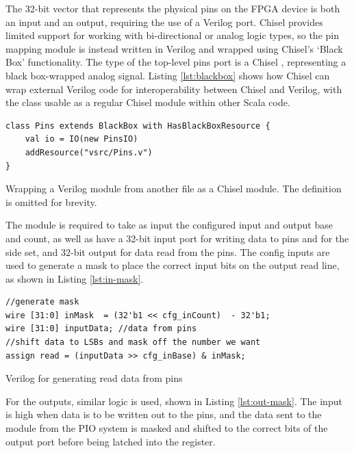 The 32-bit vector that represents the physical pins on the FPGA device is both an input and an output, requiring the use of a Verilog  port. Chisel provides limited support for working with bi-directional or analog logic types, so the pin mapping module is instead written in Verilog and wrapped using Chisel's `Black Box' functionality. The type of the top-level pins port is a Chisel , representing a black box-wrapped analog signal. Listing \ref{lst:blackbox} shows how Chisel can wrap external Verilog code for interoperability between Chisel and Verilog, with the  class usable as a regular Chisel module within other Scala code.

\begin{listing}[h!]
    \centering
    \vspace{0.5cm}
    \begin{verbatim}
class Pins extends BlackBox with HasBlackBoxResource {
    val io = IO(new PinsIO)
    addResource("vsrc/Pins.v")
}
    \end{verbatim}
    \caption{Wrapping a Verilog module from another file as a Chisel module. The  definition is omitted for brevity.}
    \label{lst:blackbox}
\end{listing}

The module is required to take as input the configured input and output base and count, as well as have a 32-bit input port for writing data to pins and for the side set, and 32-bit output for data read from the pins. The config inputs are used to generate a mask to place the correct input bits on the output read line, as shown in Listing \ref{lst:in-mask}.

\begin{listing}[h!]
    \vspace{0.5cm}
    \begin{verbatim}
//generate mask
wire [31:0] inMask  = (32'b1 << cfg_inCount)  - 32'b1; 
wire [31:0] inputData; //data from pins
//shift data to LSBs and mask off the number we want
assign read = (inputData >> cfg_inBase) & inMask; 
    \end{verbatim}
    \caption{Verilog for generating read data from pins}
    \label{lst:in-mask}
\end{listing}

For the outputs, similar logic is used, shown in Listing \ref{lst:out-mask}. The  input is high when data is to be written out to the pins, and the data sent to the module from the PIO system is masked and shifted to the correct bits of the output port before being latched into the register.

